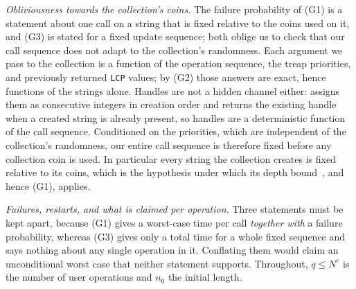 ﻿\documentclass[11pt]{article}
\theoremstyle{plain}
\theoremstyle{remark}
\begin{document}
\emph{Obliviousness towards the collection's coins.} The failure probability of (G1) is a statement about one call on a string that is fixed relative to the coins used on it, and (G3) is stated for a fixed update sequence; both oblige us to check that our call sequence does not adapt to the collection's randomness. Each argument we pass to the collection is a function of the operation sequence, the treap priorities, and previously returned \texttt{LCP} values; by (G2) those answers are exact, hence functions of the strings alone. Handles are not a hidden channel either: \cite[\S3]{GKK} assigns them as consecutive integers in creation order and returns the existing handle when a created string is already present, so handles are a deterministic function of the call sequence. Conditioned on the priorities, which are independent of the collection's randomness, our entire call sequence is therefore fixed before any collection coin is used. In particular every string the collection creates is fixed relative to its coins, which is the hypothesis under which its depth bound~\cite[Lem.~3.3]{GKK}, and hence (G1), applies.

\emph{Failures, restarts, and what is claimed per operation.} Three statements must be kept apart, because (G1) gives a worst-case time per call \emph{together with} a failure probability, whereas (G3) gives only a total time for a whole fixed sequence and says nothing about any single operation in it. Conflating them would claim an unconditional worst case that neither statement supports. Throughout, $q\le N^c$ is the number of user operations and $n_0$ the initial length.
\end{document}
